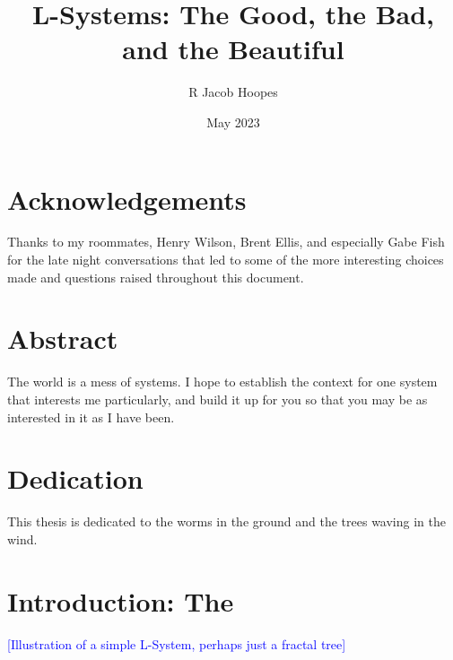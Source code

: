\documentclass[12pt,twoside]{reedthesis}
\title{L-Systems: The Good, the Bad, and the Beautiful}
\author{R Jacob Hoopes}
\date{May 2023}
\begin{document}
  \maketitle
  \frontmatter %
  \pagestyle{empty} %

    \chapter*{Acknowledgements}
	Thanks to my roommates, Henry Wilson, Brent Ellis, and especially Gabe Fish for the late night conversations that led to some of the more interesting choices made and questions raised throughout this document.



    \tableofcontents

    \chapter*{Abstract}
	The world is a mess of systems. I hope to establish the context for one system that interests me particularly, and build it up for you so that you may be as interested in it as I have been.
	
    \chapter*{Dedication}
	This thesis is dedicated to the worms in the ground and the trees waving in the wind.

  \mainmatter %
  \pagestyle{fancyplain} %

\chapter*{Introduction: The }
	
\textcolor{blue}{[Illustration of a simple L-System, perhaps just a fractal tree]}
	
\end{document}

